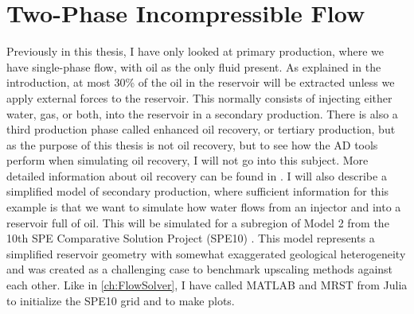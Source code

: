 \section{Two-Phase Incompressible Flow}
\label{sec:TwoPhaseSimulation}
Previously in this thesis, I have only looked at primary production, where we have single-phase flow, with oil as the only fluid present. As explained in the introduction, at most 30\% of the oil in the reservoir will be extracted unless we apply external forces to the reservoir. This normally consists of injecting either water, gas, or both, into the reservoir in a secondary production. There is also a third production phase called enhanced oil recovery, or tertiary production, but as the purpose of this thesis is not oil recovery, but to see how the AD tools perform when simulating oil recovery, I will not go into this subject. More detailed information about oil recovery can be found in \citet{lieMrstUrl}. I will also describe a simplified model of secondary production, where sufficient information for this example is that we want to simulate how water flows from an injector and into a reservoir full of oil. This will be simulated for a subregion of Model 2 from the 10th SPE Comparative Solution Project (SPE10) \citep{SPE10}. This model represents a simplified reservoir geometry with somewhat exaggerated geological heterogeneity and was created as a challenging case to benchmark upscaling methods against each other. Like in \autoref{ch:FlowSolver}, I have called MATLAB and MRST from Julia to initialize the SPE10 grid and to make plots.

